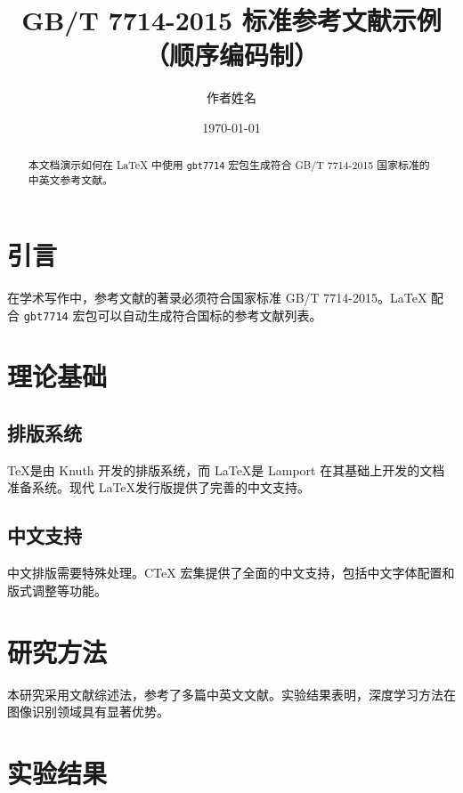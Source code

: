 \documentclass[12pt,a4paper,fontset=fandol]{ctexart}
\title{\textbf{GB/T 7714-2015 标准参考文献示例}\\
\large （顺序编码制）}
\author{作者姓名}
\date{\today}
\begin{document}
\maketitle

\begin{abstract}
本文档演示如何在 LaTeX 中使用 \texttt{gbt7714} 宏包生成符合 GB/T 7714-2015 国家标准的中英文参考文献。
\end{abstract}

\tableofcontents
\newpage

\section{引言}

在学术写作中，参考文献的著录必须符合国家标准 GB/T 7714-2015\cite{gbt7714}。LaTeX 配合 \texttt{gbt7714} 宏包可以自动生成符合国标的参考文献列表\cite{knuth1984texbook}。

\section{理论基础}

\subsection{排版系统}

\TeX 是由 Knuth 开发的排版系统\cite{knuth1984texbook}，而 \LaTeX 是 Lamport 在其基础上开发的文档准备系统\cite{lamport1994latex}。现代 \LaTeX 发行版提供了完善的中文支持\cite{ctex2018}。

\subsection{中文支持}

中文排版需要特殊处理。CTeX 宏集提供了全面的中文支持\cite{ctex2018}，包括中文字体配置和版式调整等功能。

\section{研究方法}

本研究采用文献综述法，参考了多篇中英文文献\cite{goossens1994companion, 张三2020人工智能, 李四2018机器学习}。实验结果表明，深度学习方法在图像识别领域具有显著优势\cite{王五2019深度学习, 陈七2021自然语言}。

\section{实验结果}
\end{document}
